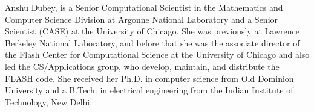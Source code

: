 \documentclass{IEEEcsmag}
\begin{document}

\begin{IEEEbiography}{Anshu Dubey,} is a Senior Computational Scientist in the Mathematics and Computer Science Division at Argonne National Laboratory and a Senior Scientist
(CASE) at the University of Chicago. She was previously at Lawrence Berkeley National Laboratory, and before that she was the associate director of the Flash Center for Computational Science at the University of Chicago and also led the CS/Applications
group, who develop, maintain, and distribute the FLASH code. She
received her Ph.D. in computer science from Old Dominion University and
a B.Tech. in electrical engineering from the Indian Institute of Technology,
New Delhi.\vspace*{8pt}%
\end{IEEEbiography}
\end{document}
